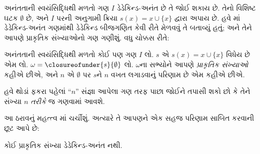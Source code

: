 અનંતતાની સ્વયંસિદ્ધિથી મળતો ગણ $I$ ડેડેકિન્ડ-અનંત છે તે જોઈ શકાય
છે. તેનો વિશિષ્ટ ઘટક $\emptyset$ છે, અને $I$ પરની અનુગામી ક્રિયા
$s(x) = x\cup
\{x\}$ દ્વારા અપાય છે. હવે
માં
ડેડેકિન્ડ-અનંત ગણમાંથી ડેડેકિન્ડ બીજગણિત કેવી રીતે મેળવવું તે
બતાવ્યું હતું; અને તેને આપણે પ્રાકૃતિક સંખ્યાઓનો ગણ ગણીશું.
વધુ ચોક્કસ રીતે:
\begin{defn}
અનંતતાની સ્વયંસિદ્ધિથી મળતો કોઈ પણ ગણ $I$ લો. $s$ એ
$s(x) = x \cup \{x\}$ વિધેય છે એમ લો. $\omega =
\closureofunder{s}{\emptyset}$ લો. $\omega$ના સભ્યોને આપણે
\emph{પ્રાકૃતિક સંખ્યાઓ} કહીએ છીએ, અને $n$ એ $\emptyset$ પર
$s$ને $n$ વખત લગાડવાનું પરિણામ છે એમ કહીએ છીએ.
\end{defn}

હવે થોડાં ફકરા પહેલાં “$n$” સંજ્ઞા આપેલા ગણ તરફ પાછા જોઈને
તપાસી શકો છો કે તેને સંખ્યા $n$ \emph{તરીકે} જ ગણવામાં આવશે.

આ ઠરાવનું મહત્ત્વ માં ચર્ચીશું.
અત્યારે તે આપણને એક સહજ પરિણામ સાબિત કરવાની છૂટ આપે છે:

\begin{prop}
કોઈ પ્રાકૃતિક સંખ્યા ડેડેકિન્ડ-અનંત નથી.
\end{prop}

